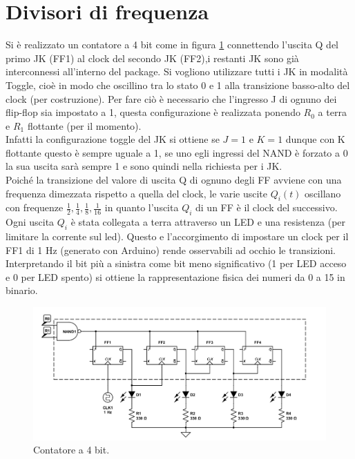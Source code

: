 \documentclass[10pt,a4paper]{article}
\begin{document}
\section{Divisori di frequenza}
Si è realizzato un contatore a 4 bit come in figura \ref{contatore} connettendo l'uscita Q del primo JK (FF1) al clock del secondo JK (FF2),i restanti JK sono già interconnessi all'interno del package. Si vogliono utilizzare tutti i JK in modalità Toggle, cioè in modo che oscillino tra lo stato 0 e 1 alla transizione basso-alto del clock (per costruzione). Per fare ciò è necessario che l'ingresso J di ognuno dei flip-flop sia impostato a 1, questa configurazione è realizzata ponendo $R_0$ a terra e $R_1$ flottante (per il momento).\\
Infatti la configurazione toggle del JK si ottiene se $J = 1$ e $K = 1$ dunque con K flottante questo è sempre uguale a 1, se uno egli ingressi del NAND è forzato a 0 la sua uscita sarà sempre 1 e sono quindi nella richiesta per i JK.\\  
Poiché la transizione del valore di uscita Q di ognuno degli FF avviene con una frequenza dimezzata rispetto a quella del clock, le varie uscite $Q_i(t)$ oscillano con frequenze $\frac{1}{2}, \frac{1}{4}, \frac{1}{8}, \frac{1}{16}$ in quanto l'uscita $Q_i$ di un FF è il clock del successivo.\\
Ogni uscita $Q_i$ è stata collegata a terra attraverso un LED e una resistenza (per limitare la corrente sul led). Questo e l'accorgimento di impostare un clock per il FF1 di 1 Hz (generato con Arduino) rende osservabili ad occhio le transizioni.\\
Interpretando il bit più a sinistra come bit meno significativo (1 per LED acceso e 0 per LED spento) si ottiene la rappresentazione fisica dei numeri da 0 a 15 in binario.\\

\begin{figure}
\centering
\includegraphics[scale=0.5]{divisore.png}
\caption{Contatore a 4 bit.\label{contatore}}
\end{figure}
\end{document}
